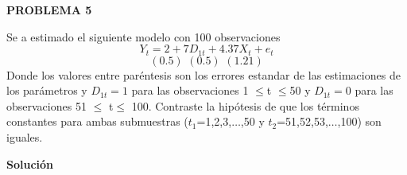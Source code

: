 \documentclass[10pt,a4paper, openany ]{book}
\begin{document}
  \pagecolor{pagecolor}
  \color{verdeclaro}
  \newpage
  \Large
  \newpage
    \begin{center}
        \textbf{PROBLEMA 5}
    \end{center}
    Se a estimado el siguiente modelo con 100 observaciones 
    \begin{equation*}
        Y_{t} = 2 +7D_{1t}+4.37X_{t}+e_{t}
    \end{equation*}
    \begin{equation*}
        (0.5)\, \, (0.5) \, \, (1.21)
    \end{equation*}
    Donde los valores entre paréntesis son los errores estandar de las estimaciones de los parámetros y $D_{1t}=1$ para las observaciones 1 $\leq$t $\leq$50 y $D_{1t}=0$ para las observaciones 51 $\leq$ t$\leq$ 100.
    Contraste la hipótesis de que los términos constantes para ambas submuestras ($t_{1}$=1,2,3,$\dots$,50 y $t_{2}$=51,52,53,$\dots$,100) son iguales.
    \begin{center}
        \textbf{Solución}
    \end{center}
\end{document}
